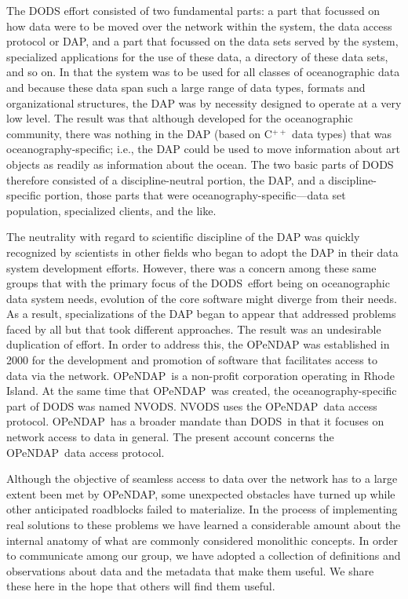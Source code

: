 \documentclass{codata}
\newcommand{\opendap}{\ac{OPeNDAP}}
\newcommand{\dods}{\ac{DODS}}
\begin{document}
The \ac{DODS} effort consisted of two fundamental parts: a part that 
focussed on how data were to be moved over the network within the system,
the data access protocol or DAP, and a part that focussed on the data 
sets served by the system, specialized applications for the use of these 
data, a directory of these data sets, and so on. In that the system was to be
used for all classes of oceanographic data and because these data span
such a large range of data types, formats and organizational structures, 
the DAP was by necessity designed to operate at a very low level. The
result was that although developed for the oceanographic community,
there was nothing in the DAP (based on C$^{++}$ data types) that was 
oceanography-specific; i.e., the DAP could be used to move information 
about art objects as readily as information about the ocean. The two
basic parts of \ac{DODS} therefore consisted of a discipline-neutral 
portion, the DAP, and a discipline-specific portion, those parts that
were oceanography-specific---data set population, specialized clients, 
and the like. 

The neutrality with regard to scientific discipline of the DAP was
quickly recognized by scientists in other fields who began to adopt the
DAP in their data system development efforts. However, there was a
concern among these same groups that with the primary focus of the
\dods\ effort being on oceanographic data system needs, evolution of
the core software might diverge from their needs. As a result,
specializations of the DAP began to appear that
addressed problems faced by all but that took different approaches.
The result was an undesirable duplication of effort. In order to
address this, the \acf{OPeNDAP} was established in 2000 for the
development and promotion of software that facilitates access to data
via the network.  \opendap\ is a non-profit corporation operating in
Rhode Island.  At the same time that \opendap\ was created, the
oceanography-specific part of \ac{DODS} was named \ac{NVODS}.
\ac{NVODS} uses the \opendap\ data access protocol. \opendap\ has a
broader mandate than \dods\ in that it focuses on network access to
data in general.  The present account concerns the \opendap\ data access
protocol.

Although the objective of seamless access to data over the network
has to a large extent been met by \opendap, some
unexpected obstacles have turned up while other anticipated
roadblocks failed to materialize.  In the process of implementing real
solutions to these problems we have learned a considerable amount
about the internal anatomy of what are commonly considered monolithic
concepts.  In order to communicate among our group, we have adopted a
collection of definitions and observations about data and the metadata
that make them useful.  We share these here in the hope that others
will find them useful.
\end{document}
